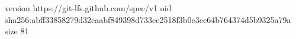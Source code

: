 version https://git-lfs.github.com/spec/v1
oid sha256:abff33858279d32caabf849398d733ce2518f3b0e3cc64b764374d5b9325a79a
size 81
